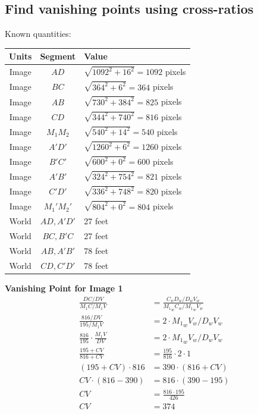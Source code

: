 \documentclass[12pt, oneside]{article}
\begin{document}
\subsection{Find vanishing points using cross-ratios}

Known quantities:
\begin{table}[H]
\centering
\begin{tabular}{|c|c|l|}
\hline
\multicolumn{1}{|l|}{\textbf{Units}} & \textbf{Segment} & \textbf{Value}                \\ \hline
Image & $AD$      & $\sqrt{1092^2 + 16^2} = 1092$ pixels     \\ \hline
Image & $BC$      & $\sqrt{364^2 + 6^2} = 364$ pixels       \\ \hline
Image & $AB$      & $\sqrt{730^2 + 384^2} = 825$ pixels     \\ \hline
Image & $CD$      & $\sqrt{344^2 + 740^2} = 816$ pixels     \\ \hline
Image & $M_1 M_2$ & $\sqrt{540^2 + 14^2} = 540$ pixels     \\ \hline
Image & $A'D'$      & $\sqrt{1260^2 + 6^2} = 1260$ pixels     \\ \hline
Image & $B'C'$      & $\sqrt{600^2 + 0^2} = 600$ pixels       \\ \hline
Image & $A'B'$      & $\sqrt{324^2 + 754^2} = 821$ pixels     \\ \hline
Image & $C'D'$      & $\sqrt{336^2 + 748^2} = 820$ pixels     \\ \hline
Image & $M_1' M_2'$ & $\sqrt{804^2 + 0^2} = 804$ pixels     \\ \hline
World & $AD, A'D'$      & 27 feet     \\ \hline
World & $BC, B'C$       & 27 feet     \\ \hline
World & $AB, A'B'$      & 78 feet     \\ \hline
World & $CD, C'D'$      & 78 feet     \\ \hline
\end{tabular}
\end{table}

\textbf{Vanishing Point for Image 1}
\begin{align*}
  \frac{DC/DV}{{M_1}C/M_1V} &= \frac{C_wD_w/D_wV_w}{{M_1}_wC_w/{M_1}_wV_w} \\
  \frac{816/DV}{195/M_1V}                 &= 2 \cdot {M_1}_wV_w/D_wV_w \\
  \frac{816}{195}\cdot \frac{M_1V}{DV}    &= 2 \cdot {M_1}_wV_w/D_wV_w \\
  \frac{195 + CV}{816 + CV}   &= \frac{195}{816}\cdot 2 \cdot 1 \\
  (195 + CV) \cdot 816   &= 390 \cdot (816 + CV) \\
  CV \cdot (816 - 390)   &= 816 \cdot (390 - 195)\\
  CV  &= \frac{816 \cdot 195} {426}\\
  CV  &= 374\\
\end{align*}
\end{document}
